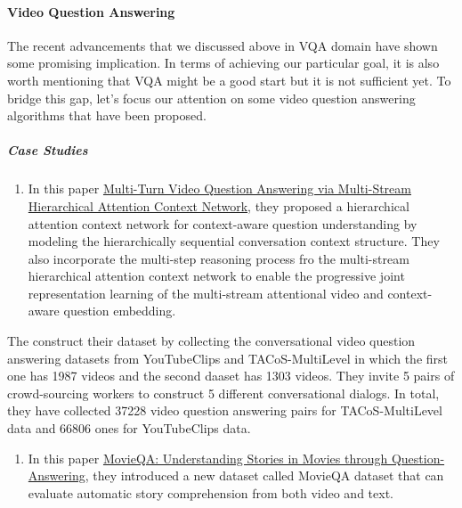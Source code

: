 \documentclass[]{book}
\providecommand{\tightlist}{%
  \setlength{\itemsep}{0pt}\setlength{\parskip}{0pt}}
\let\oldparagraph\paragraph
\renewcommand{\paragraph}[1]{\oldparagraph{#1}\mbox{}}
\let\oldsubparagraph\subparagraph
\renewcommand{\subparagraph}[1]{\oldsubparagraph{#1}\mbox{}}
\theoremstyle{definition}
\theoremstyle{definition}
\theoremstyle{definition}
\theoremstyle{remark}
\begin{document}
\paragraph{Video Question Answering}\label{video-question-answering}

The recent advancements that we discussed above in VQA domain have shown
some promising implication. In terms of achieving our particular goal,
it is also worth mentioning that VQA might be a good start but it is not
sufficient yet. To bridge this gap, let's focus our attention on some
video question answering algorithms that have been proposed.

\subparagraph{Case Studies}\label{case-studies-2}

\begin{enumerate}
\def\labelenumi{\arabic{enumi}.}
\tightlist
\item
  In this paper
  \href{https://www.ijcai.org/proceedings/2018/0513.pdf}{Multi-Turn
  Video Question Answering via Multi-Stream Hierarchical Attention
  Context Network}, they proposed a hierarchical attention context
  network for context-aware question understanding by modeling the
  hierarchically sequential conversation context structure. They also
  incorporate the multi-step reasoning process fro the multi-stream
  hierarchical attention context network to enable the progressive joint
  representation learning of the multi-stream attentional video and
  context-aware question embedding.
\end{enumerate}

The construct their dataset by collecting the conversational video
question answering datasets from YouTubeClips and TACoS-MultiLevel in
which the first one has 1987 videos and the second daaset has 1303
videos. They invite 5 pairs of crowd-sourcing workers to construct 5
different conversational dialogs. In total, they have collected 37228
video question answering pairs for TACoS-MultiLevel data and 66806 ones
for YouTubeClips data.

\begin{enumerate}
\def\labelenumi{\arabic{enumi}.}
\setcounter{enumi}{1}
\tightlist
\item
  In this paper \href{https://arxiv.org/pdf/1512.02902.pdf}{MovieQA:
  Understanding Stories in Movies through Question-Answering}, they
  introduced a new dataset called MovieQA dataset that can evaluate
  automatic story comprehension from both video and text.
\end{enumerate}
\end{document}
